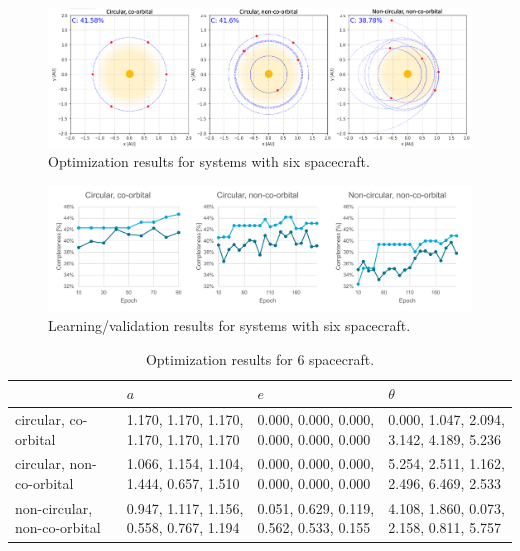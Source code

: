 \begin{figure}[htbp]
 \centering
 \includegraphics[width=1.0\textwidth]{img/orbits_6.png}
 \caption{Optimization results for systems with six spacecraft.}
 \label{fig:orbits_6}
\end{figure}
\begin{figure}[htbp]
 \centering
 \includegraphics[width=1.0\textwidth]{img/val_orbits_6.pdf}
 \caption{Learning/validation results for systems with six spacecraft.}
 \label{fig:val_orbits_6}
\end{figure}

\begin{table}[htbp]
\centering
\caption{Optimization results for 6 spacecraft.}
\label{tab:opt_6}
\begin{tabulary}{1.0\textwidth}{L|LLL}
                             & $a$                                          & $e$                                          & $\theta$                                      \\ \hline
circular, co-orbital         & 1.170,   1.170, 1.170, 1.170, 1.170, 1.170 & 0.000, 0.000, 0.000, 0.000,   0.000, 0.000 & 0.000, 1.047, 2.094, 3.142,   4.189, 5.236 \\
circular, non-co-orbital     & 1.066,   1.154, 1.104, 1.444, 0.657, 1.510 & 0.000, 0.000, 0.000, 0.000,   0.000, 0.000 & 5.254, 2.511, 1.162, 2.496,   6.469, 2.533 \\
non-circular, non-co-orbital & 0.947,   1.117, 1.156, 0.558, 0.767, 1.194 & 0.051, 0.629, 0.119, 0.562,   0.533, 0.155 & 4.108, 1.860, 0.073, 2.158,   0.811, 5.757
\end{tabulary}
\end{table}

